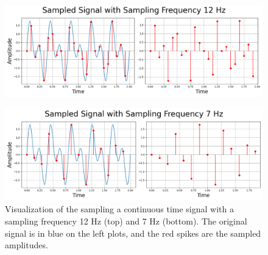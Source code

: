\documentclass{article}
\begin{document}
\begin{figure}[H]
    \centering
    \begin{minipage}{0.8\textwidth}
        \centering
        \includegraphics[width=\linewidth]{images/sampled_multiple_12.png}
        \\[0.5em] 
    \end{minipage}
    
    \begin{minipage}{0.8\textwidth}
        \centering
        \includegraphics[width=\linewidth]{images/sampled_multiple_7hz.png}
    \end{minipage}
    
    \caption{Visualization of the sampling a continuous time signal with a sampling frequency 12 Hz (top) and 7 Hz (bottom). 
    The original signal is in blue on the left plots, and the red spikes are the sampled amplitudes.}
\end{figure}
    
    
\end{document}
